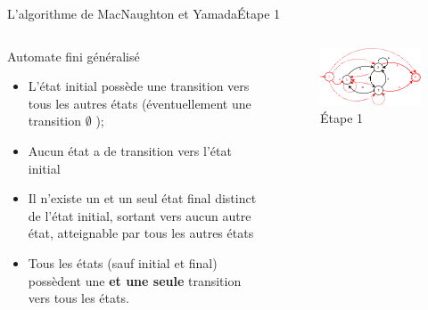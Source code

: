 \documentclass{beamer}
\begin{document}
\begin{frame}{L'algorithme de MacNaughton et Yamada}{Étape 1}
     \begin{columns}[T]
     \begin{column}{.48\textwidth}
         {\fontsize{8}{9}\selectfont Automate fini généralisé}
         \begin{itemize}
         
             \item {\fontsize{7}{8}\selectfont L'état initial possède une transition vers tous les autres états (éventuellement une transition $\emptyset$ );}
             \item {\fontsize{7}{8}\selectfont Aucun état a de transition vers l'état initial}
             \item {\fontsize{7}{8}\selectfont Il n'existe un et un seul état final distinct de l'état initial, sortant vers aucun autre état, atteignable par tous les autres états}
             \item
             {\fontsize{7}{8}\selectfont Tous les états (sauf initial et final) possèdent une \textbf{et une seule} transition vers tous les états. }
         \end{itemize}
     \end{column}
     
     \begin{column}{.48\textwidth}
     \begin{figure}
     \includegraphics[scale=0.37]{Diagramme2.png}
     \centering
     \caption{Étape 1}     
     \end{figure}
     \end{column}
        
     \end{columns}

\end{frame}
\end{document}

